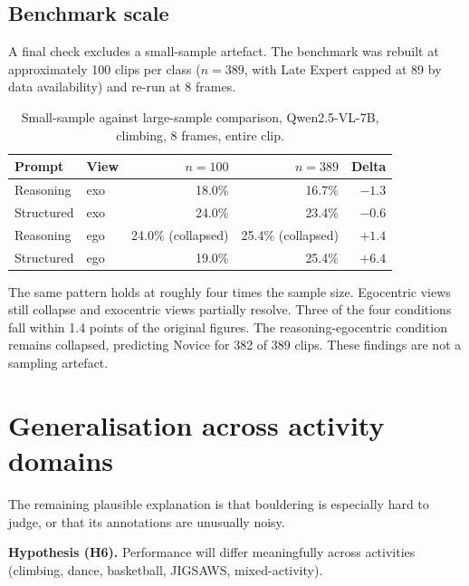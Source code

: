 \documentclass[logo,msc]{infthesis}
\newcommand{\runin}[1]{\par\medskip\noindent\textbf{#1}}
\begin{document}
\subsection{Benchmark scale}

A final check excludes a small-sample artefact. The benchmark was rebuilt
at approximately 100 clips per class ($n = 389$, with Late Expert capped at
89 by data availability) and re-run at 8 frames.

\begin{table}[H]
\centering
\caption{Small-sample against large-sample comparison, Qwen2.5-VL-7B,
climbing, 8 frames, entire clip.}
\label{tab:scale}
\small
\begin{tabular}{@{}l l r r r@{}}
\toprule
\textbf{Prompt} & \textbf{View} & \textbf{$n = 100$} & \textbf{$n = 389$}
 & \textbf{Delta} \\
\midrule
Reasoning  & exo & 18.0\%             & 16.7\%             & $-1.3$ \\
Structured & exo & 24.0\%             & 23.4\%             & $-0.6$ \\
Reasoning  & ego & 24.0\% (collapsed) & 25.4\% (collapsed) & $+1.4$ \\
Structured & ego & 19.0\%             & 25.4\%             & $+6.4$ \\
\bottomrule
\end{tabular}
\end{table}

The same pattern holds at roughly four times the sample size. Egocentric
views still collapse and exocentric views partially resolve. Three of the
four conditions fall within 1.4 points of the original figures. The
reasoning-egocentric condition remains collapsed, predicting Novice for 382
of 389 clips. These findings are not a sampling artefact.

\section{Generalisation across activity domains}

The remaining plausible explanation is that bouldering is especially hard
to judge, or that its annotations are unusually noisy.

\runin{Hypothesis (H6).} Performance will differ meaningfully across
activities (climbing, dance, basketball, JIGSAWS, mixed-activity).
\end{document}
